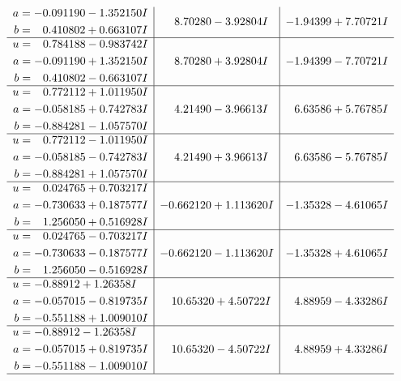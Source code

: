 \documentclass[1p]{elsarticle_modified}
\theoremstyle{definition}
\begin{document}
$$\begin{array}{c|c|c}
\begin{aligned}
a &= -0.091190 - 1.352150 I \\
b &= \phantom{-}0.410802 + 0.663107 I\end{aligned}
 & \phantom{-}8.70280 - 3.92804 I & -1.94399 + 7.70721 I \\ \hline\begin{aligned}
u &= \phantom{-}0.784188 - 0.983742 I \\
a &= -0.091190 + 1.352150 I \\
b &= \phantom{-}0.410802 - 0.663107 I\end{aligned}
 & \phantom{-}8.70280 + 3.92804 I & -1.94399 - 7.70721 I \\ \hline\begin{aligned}
u &= \phantom{-}0.772112 + 1.011950 I \\
a &= -0.058185 + 0.742783 I \\
b &= -0.884281 - 1.057570 I\end{aligned}
 & \phantom{-}4.21490 - 3.96613 I & \phantom{-}6.63586 + 5.76785 I \\ \hline\begin{aligned}
u &= \phantom{-}0.772112 - 1.011950 I \\
a &= -0.058185 - 0.742783 I \\
b &= -0.884281 + 1.057570 I\end{aligned}
 & \phantom{-}4.21490 + 3.96613 I & \phantom{-}6.63586 - 5.76785 I \\ \hline\begin{aligned}
u &= \phantom{-}0.024765 + 0.703217 I \\
a &= -0.730633 + 0.187577 I \\
b &= \phantom{-}1.256050 + 0.516928 I\end{aligned}
 & -0.662120 + 1.113620 I & -1.35328 - 4.61065 I \\ \hline\begin{aligned}
u &= \phantom{-}0.024765 - 0.703217 I \\
a &= -0.730633 - 0.187577 I \\
b &= \phantom{-}1.256050 - 0.516928 I\end{aligned}
 & -0.662120 - 1.113620 I & -1.35328 + 4.61065 I \\ \hline\begin{aligned}
u &= -0.88912 + 1.26358 I \\
a &= -0.057015 - 0.819735 I \\
b &= -0.551188 + 1.009010 I\end{aligned}
 & \phantom{-}10.65320 + 4.50722 I & \phantom{-}4.88959 - 4.33286 I \\ \hline\begin{aligned}
u &= -0.88912 - 1.26358 I \\
a &= -0.057015 + 0.819735 I \\
b &= -0.551188 - 1.009010 I\end{aligned}
 & \phantom{-}10.65320 - 4.50722 I & \phantom{-}4.88959 + 4.33286 I\\
 \hline 
 \end{array}$$\newpage
\end{document}
